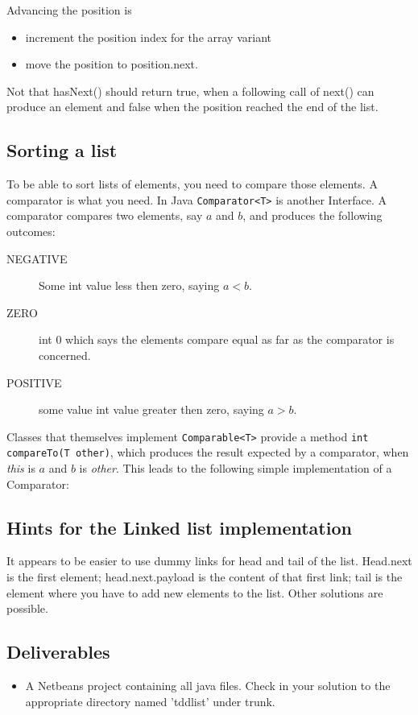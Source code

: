 \documentclass[twocolumn,a4paper]{article}
\providecommand\Code[1]{{\color{fontys}\ttfamily#1}}
\begin{document}
Advancing the position is
\begin{itemize}
\item increment the position index for the array variant
\item move the position to position.next.
\end{itemize}

Not that \Code{hasNext()} should return true, when a following call of
\Code{next()} can produce an element and false when the position
reached the end of the list.

\subsection*{Sorting a  list}
To be able to sort lists of elements, you need to compare those
elements. A comparator is what you need. In Java \lstinline{Comparator<T>} is another
Interface. A comparator compares two
elements, say $a$ and $b$, and produces the following outcomes:
\begin{description}%
\item[NEGATIVE] Some int value less then zero, saying $a < b$.
\item[ZERO] int 0 which says the elements compare equal as far as the comparator
  is concerned.
\item[POSITIVE] some value int value greater then zero, saying $a > b $.
\end{description}


Classes that themselves implement \lstinline{Comparable<T>} provide a
method \lstinline{int compareTo(T other)}, which produces the result
expected by a comparator, when \textit{this} is $a$ and $b$ is
\textit{other}.
This leads to the following simple implementation of a Comparator:



\subsection*{Hints for the Linked list implementation}
It appears to be easier to use dummy links for head and tail of the
list.
Head.next is the first element; head.next.payload is the content of
that first link; tail is the element where you have to
add new elements to the list.
Other solutions are possible.

\subsection*{Deliverables}
\begin{itemize}
\item A Netbeans project containing all java files. Check in your
  solution to the appropriate directory named 'tddlist' under trunk.
\end{itemize}
\end{document}
